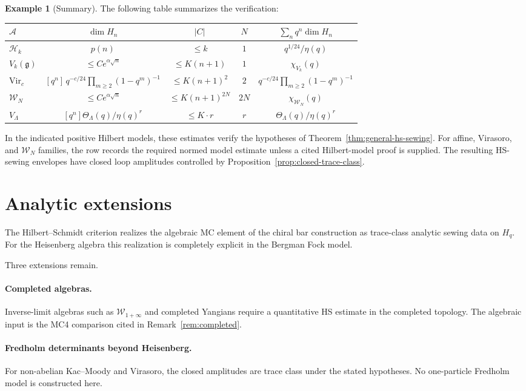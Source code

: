\documentclass[11pt,reqno]{amsart}
\theoremstyle{definition}
\newtheorem{example}[theorem]{Example}
\theoremstyle{remark}
\newcommand{\cA}{\mathcal{A}}
\newcommand{\cH}{\mathcal{H}}
\newcommand{\cW}{\mathcal{W}}
\newcommand{\Vir}{\mathrm{Vir}}
\newcommand{\fg}{\mathfrak{g}}
\numberwithin{equation}{section}
\begin{document}
\begin{example}[Summary]\label{ex:summary}
The following table summarizes the verification:
\begin{center}
\begin{tabular}{l|ccc|c}
$\cA$ & $\dim H_n$ & $|C|$ & $N$ & $\sum_n q^n\dim H_n$ \\ \hline
$\cH_k$ & $p(n)$ & $\leq k$ & $1$
& $q^{1/24}/\eta(q)$ \\
$V_k(\fg)$ & $\leq Ce^{\alpha\sqrt n}$
& $\leq K(n+1)$ & $1$ & $\chi_{V_k}(q)$ \\
$\Vir_c$ & $[q^n]\,q^{-c/24}\prod_{m\ge2}(1-q^m)^{-1}$
& $\leq K(n+1)^2$ & $2$
& $q^{-c/24}\prod_{m\ge2}(1-q^m)^{-1}$ \\
$\cW_N$ & $\leq Ce^{\alpha\sqrt n}$
& $\leq K(n+1)^{2N}$ & $2N$
& $\chi_{\cW_N}(q)$ \\
$V_\Lambda$ & $[q^n]\Theta_\Lambda(q)/\eta(q)^r$
& $\leq K \cdot r$ & $r$
& $\Theta_\Lambda(q)/\eta(q)^r$
\end{tabular}
\end{center}
In the indicated positive Hilbert models, these estimates verify
the hypotheses of Theorem~\ref{thm:general-hs-sewing}. For affine,
Virasoro, and $\cW_N$ families, the row records the required normed
model estimate unless a cited Hilbert-model proof is supplied. The
resulting HS-sewing envelopes have closed loop amplitudes controlled
by Proposition~\ref{prop:closed-trace-class}.
\end{example}

\section{Analytic extensions}\label{sec:conclusion}

The Hilbert--Schmidt criterion realizes the algebraic MC element of
the chiral bar construction as trace-class analytic sewing data on
$H_q$. For the Heisenberg algebra this realization is completely
explicit in the Bergman Fock model.

Three extensions remain.

\paragraph{Completed algebras.}
Inverse-limit algebras such as $\cW_{1+\infty}$ and completed
Yangians require a quantitative HS estimate in the completed
topology. The algebraic input is the MC4 comparison cited in
Remark~\ref{rem:completed}.

\paragraph{Fredholm determinants beyond Heisenberg.}
For non-abelian Kac--Moody and Virasoro, the closed amplitudes
are trace class under the stated hypotheses. No one-particle
Fredholm model is constructed here.
\end{document}
